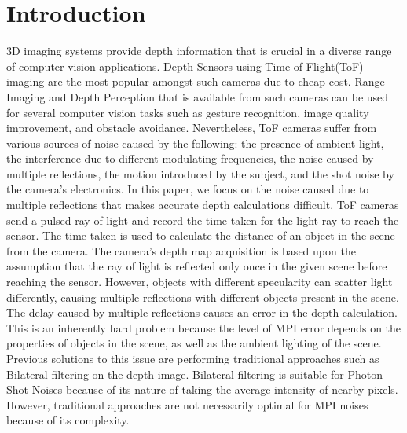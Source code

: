\documentclass[runningheads]{llncs}
\begin{document}
\section{Introduction}

3D imaging systems provide depth information that is crucial in a diverse range of computer vision applications. Depth Sensors using Time-of-Flight(ToF) imaging are the most popular amongst such cameras due to cheap cost. 
Range Imaging and Depth Perception that is available from such cameras can be used for several computer vision tasks such as gesture recognition, image quality improvement, and obstacle avoidance. 
Nevertheless, ToF cameras suffer from various sources of noise caused by the following: the presence of ambient light, the interference due to different modulating frequencies, the noise caused by multiple reflections, the motion introduced by the subject, and the shot noise by the camera's electronics.
In this paper, we focus on the noise caused due to multiple reflections that makes accurate depth calculations difficult. 
\newline
\newline
ToF cameras send a pulsed ray of light and record the time taken for the light ray to reach the sensor. 
The time taken is used to calculate the distance of an object in the scene from the camera. 
The camera's depth map acquisition is based upon the assumption that the ray of light is reflected only once in the given scene before reaching the sensor. 
However, objects with different specularity can scatter light differently, causing multiple reflections with different objects present in the scene. 
The delay caused by multiple reflections causes an error in the depth calculation. 
This is an inherently hard problem because the level of MPI error depends on the properties of objects in the scene, as well as the ambient lighting of the scene.
\newline
\newline
% 
Previous solutions \cite{tomasi1998bilateral,zhang2014rolling} to this issue are performing traditional approaches such as Bilateral filtering on the depth image. 
Bilateral filtering is suitable for Photon Shot Noises because of its nature of taking the average intensity of nearby pixels. 
However, traditional approaches are not necessarily optimal for MPI noises because of its complexity. 
\end{document}
